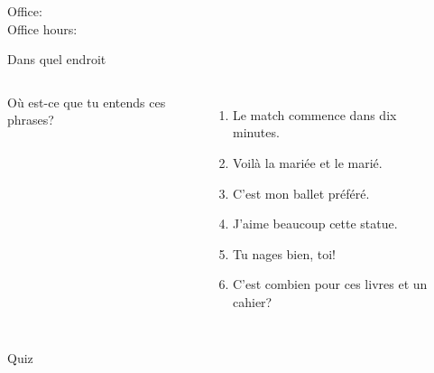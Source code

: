 \documentclass{beamer}
\subtitle[Destinations et impératif]{Des destinations diverses et l'impératif}
\begin{document}
  \begin{frame}
    \titlepage
    \tiny{Office: \\
          Office hours: }
  \end{frame}

  \begin{frame}{Dans quel endroit}
    \begin{columns}
        Où est-ce que tu entends ces phrases?
        \begin{enumerate}
          \item Le match commence dans dix minutes.
          \item<3-> Voilà la mariée et le marié.
          \item<5-> C'est mon ballet préféré.
          \item<7-> J'aime beaucoup cette statue.
          \item<9-> Tu nages bien, toi!
          \item<11-> C'est combien pour ces livres et un cahier?
        \end{enumerate}
        \begin{minipage}[c][0.6\textheight]{\linewidth}
          \begin{center}
          \end{center}
        \end{minipage}
    \end{columns}
  \end{frame}

  \begin{frame}{}
    \begin{center}
      \Large Quiz
    \end{center}
  \end{frame}
\end{document}
